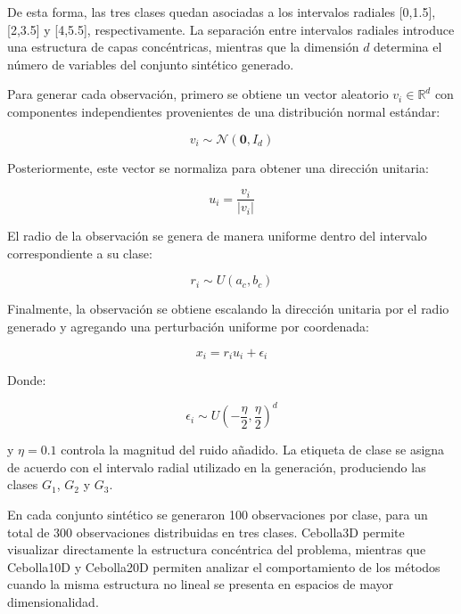 De esta forma, las tres clases quedan asociadas a los intervalos radiales [0,1.5], [2,3.5] y [4,5.5], respectivamente. La separación entre intervalos radiales introduce una estructura de capas concéntricas, mientras que la dimensión $d$ determina el número de variables del conjunto sintético generado.

Para generar cada observación, primero se obtiene un vector aleatorio $v_i \in \mathbb{R}^d$ con componentes independientes provenientes de una distribución normal estándar:

\begin{equation}
	v_i \sim \mathcal{N}(\mathbf{0}, I_d)	
	\label{eq:EM16}
\end{equation}

Posteriormente, este vector se normaliza para obtener una dirección unitaria:

\begin{equation}
	u_i = \frac{v_i}{|v_i|}	
	\label{eq:EM17}
\end{equation}

El radio de la observación se genera de manera uniforme dentro del intervalo correspondiente a su clase:

\begin{equation}
	r_i \sim U(a_c,b_c)	
	\label{eq:EM18}
\end{equation}

Finalmente, la observación se obtiene escalando la dirección unitaria por el radio generado y agregando una perturbación uniforme por coordenada:

\begin{equation}
	x_i = r_iu_i + \epsilon_i	
	\label{eq:EM19}
\end{equation}

Donde:

\begin{equation}
	\epsilon_i \sim U\left(-\frac{\eta}{2}, \frac{\eta}{2}\right)^d
	\label{eq:EM20}
\end{equation}

\noindent y $\eta = 0.1$ controla la magnitud del ruido añadido. La etiqueta de clase se asigna de acuerdo con el intervalo radial utilizado en la generación, produciendo las clases $G_1$, $G_2$ y $G_3$.

En cada conjunto sintético se generaron 100 observaciones por clase, para un total de 300 observaciones distribuidas en tres clases. Cebolla3D permite visualizar directamente la estructura concéntrica del problema, mientras que Cebolla10D y Cebolla20D permiten analizar el comportamiento de los métodos cuando la misma estructura no lineal se presenta en espacios de mayor dimensionalidad.

